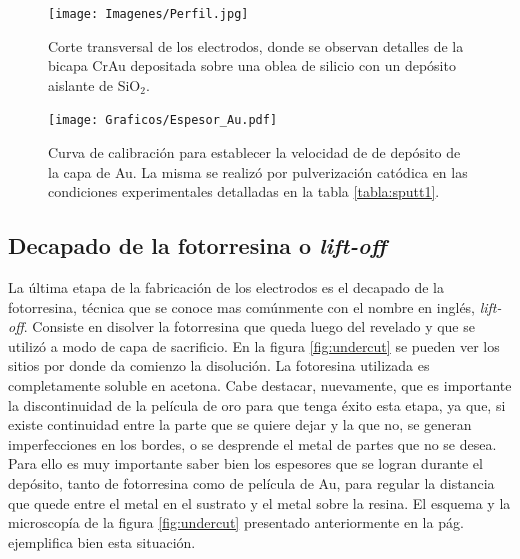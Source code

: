 						  \begin{figure}[h!]
						  \begin{center}
						  \texttt{[image: Imagenes/Perfil.jpg]}
						  \caption[Sección trasversal de los eletrodos]{Corte transversal de los electrodos, donde se observan detalles de la bicapa Cr\textbar Au depositada sobre una oblea de silicio con un depósito aislante de SiO$_2$.}
						  \label{fig:FIB_electrodos}
						  \end{center}
						  \end{figure} 	

					   		\begin{figure}[h!]
					   		\begin{center}
							\texttt{[image: Graficos/Espesor\_Au.pdf]}
							\caption[Curva de calibración para el espesor de los electrodos]{Curva de calibración para establecer la velocidad de de depósito de la capa de Au. La misma se realizó por pulverización catódica en las condiciones experimentales detalladas en la tabla \ref{tabla:sputt1}.}
							\label{fig:calibracionAu}
							\end{center}
							\end{figure}		  
		
	\subsection{Decapado de la fotorresina o\textit{ lift-off}}

		 La última etapa de la fabricación de los electrodos es el decapado de la fotorresina, técnica que se conoce mas comúnmente con el nombre en inglés, \textit{lift-off}. Consiste en disolver la fotorresina que queda luego del revelado y que se utilizó a modo de capa de sacrificio. En la figura \ref{fig:undercut} se pueden ver los sitios por donde da comienzo la disolución. La fotoresina utilizada es completamente soluble en acetona. Cabe destacar, nuevamente, que es importante la discontinuidad de la película de oro para que tenga éxito esta etapa, ya que, si existe continuidad entre la parte que se quiere dejar y la que no, se generan imperfecciones en los bordes, o se desprende el metal de partes que no se desea. Para ello es muy importante saber bien los espesores que se logran durante el depósito, tanto de fotorresina como de película de Au, para regular la distancia que quede entre el metal en el sustrato y el metal sobre la resina. El esquema y la microscopía de la figura \ref{fig:undercut} presentado anteriormente en la pág. \pageref{fig:undercut} ejemplifica bien esta situación.

